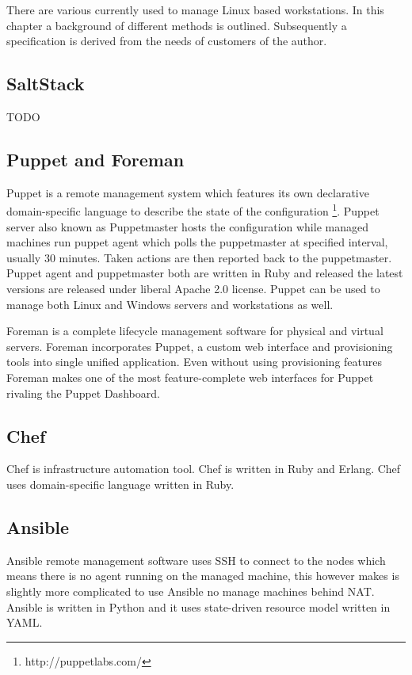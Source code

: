 \documentclass{article}
\begin{document}
There are various  currently used to manage Linux based workstations. In this chapter a background of different methods is outlined. Subsequently a specification is derived from the needs of customers of the author. 


\subsection{SaltStack}
TODO

\subsection{Puppet and Foreman}

Puppet is a remote management system which features its own declarative domain-specific language to describe the state of the configuration \footnote{http://puppetlabs.com/}. Puppet server also known as Puppetmaster hosts the configuration while managed machines run puppet agent which polls the puppetmaster at specified interval, usually 30 minutes. Taken actions are then reported back to the puppetmaster. Puppet agent and puppetmaster both are written in Ruby and released the latest versions are released under liberal Apache 2.0 license. Puppet can be used to manage both Linux and Windows servers and workstations as well.

Foreman is a complete lifecycle management software for physical and virtual servers. Foreman incorporates Puppet, a custom web interface and provisioning tools into single unified application. Even without using provisioning features Foreman makes one of the most feature-complete web interfaces for Puppet rivaling the Puppet Dashboard.

\subsection{Chef}

Chef is infrastructure automation tool. Chef is written in Ruby and Erlang. Chef uses domain-specific language written in Ruby.

\subsection{Ansible}

Ansible remote management software uses SSH to connect to the nodes which means there is no agent running on the managed machine, this however makes is slightly more complicated to use Ansible no manage machines behind NAT. Ansible is written in Python and it uses state-driven resource model written in YAML.
\end{document}
